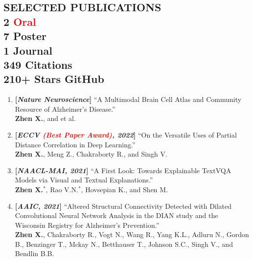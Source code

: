 \documentclass[margin]{res}
\begin{document}
\begin{resume}
\section{SELECTED PUBLICATIONS \\ \small{ 2 {\textcolor{red}{Oral}}\\ 7 Poster\\ 1 Journal \\ 349 Citations \\ 210+ Stars GitHub}  }
                \begin{enumerate}[noitemsep,wide=0pt,leftmargin=\dimexpr\labelwidth + 2\labelsep\relax]\itemsep -0.0pt
                \item \textbf{[\emph{Nature Neuroscience}]} ``A Multimodal Brain Cell Atlas and Community Resource of Alzheimer's Disease.''\\
                				\textbf{Zhen X.}, and et al.
                \item \textbf{[\emph{ECCV \textcolor{red}{(Best Paper Award)}, 2022}]} ``On the Versatile Uses of Partial Distance Correlation in Deep Learning.''\\
                            \textbf{Zhen X.}, Meng Z., Chakraborty R., and Singh V.
                \item \textbf{[\emph{NAACL-MAI, 2021}]} ``A First Look: Towards Explainable TextVQA Models via Visual and Textual Explanations.''\\
                            \textbf{Zhen X.}$^*$, Rao V.N.$^*$, Hovsepian K., and Shen M.
                \item \textbf{[\emph{AAIC, 2021}]} ``Altered Structural Connectivity Detected with Dilated Convolutional Neural Network Analysis in the DIAN study and the Wisconsin Registry for Alzheimer's Prevention.''\\
                            \textbf{Zhen X.}, Chakraborty R., Vogt N., Wang R., Yang K.L., Adluru N., Gordon B., Benzinger T., Mckay N., Betthauser T., Johnson S.C., Singh V., and Bendlin B.B.

\end{enumerate}
\end{resume}
\end{document}
